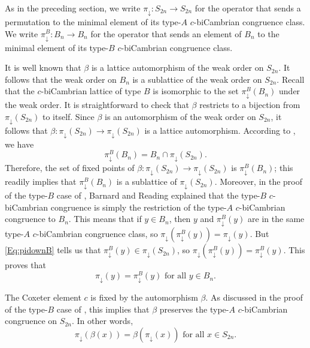 \documentclass[11pt]{amsart}
\theoremstyle{definition}
\begin{document}
As in the preceding section, we write $\pi_\downarrow\colon S_{2n}\to S_{2n}$ for the operator that sends a permutation to the minimal element of its type-$A$ $c$-biCambrian congruence class. We write $\pi_\downarrow^B\colon B_n\to B_n$ for the operator that sends an element of $B_n$ to the minimal element of its type-$B$ $c$-biCambrian congruence class.

It is well known that $\beta$ is a lattice automorphism of the weak order on $S_{2n}$. It follows that the weak order on $B_n$ is a sublattice of the weak order on $S_{2n}$. Recall that the $c$-biCambrian lattice of type $B$ is isomorphic to the set $\pi_\downarrow^B(B_n)$ under the weak order. It is straightforward to check that $\beta$ restricts to a bijection from $\pi_\downarrow(S_{2n})$ to itself. Since $\beta$ is an automorphism of the weak order on $S_{2n}$, it follows that $\beta\colon \pi_{\downarrow}(S_{2n})\to \pi_{\downarrow}(S_{2n})$ is a lattice automorphism. According to \cite[Proposition~3.15]{BarnardReading}, we have \begin{equation}\label{Eq:pidownB}
    \pi_\downarrow^B(B_n)=B_n\cap \pi_\downarrow(S_{2n}).
\end{equation} Therefore, the set of fixed points of $\beta\colon \pi_{\downarrow}(S_{2n})\to \pi_{\downarrow}(S_{2n})$ is $\pi_\downarrow^B(B_n)$; this readily implies that $\pi_\downarrow^B(B_n)$ is a sublattice of $\pi_\downarrow(S_{2n})$. Moreover, in the proof of the type-$B$ case of \cite[Theorem~2.12]{BarnardReading}, Barnard and Reading explained that the type-$B$ $c$-biCambrian congruence is simply the restriction of the type-$A$ $c$-biCambrian congruence to $B_n$. This means that if $y\in B_n$, then $y$ and $\pi_\downarrow^B(y)$ are in the same type-$A$ $c$-biCambrian congruence class, so $\pi_\downarrow(\pi_\downarrow^B(y))=\pi_\downarrow(y)$. But \eqref{Eq:pidownB} tells us that $\pi_\downarrow^B(y)\in\pi_\downarrow(S_{2n})$, so $\pi_\downarrow(\pi_\downarrow^B(y))=\pi_\downarrow^B(y)$. This proves that \begin{equation}\label{Eq:pidownB2}
\pi_\downarrow(y)=\pi_\downarrow^B(y)\text{ for all }y\in B_n.
\end{equation}

The Coxeter element $c$ is fixed by the automorphism $\beta$. As discussed in the proof of the type-$B$ case of \cite[Theorem~2.12]{BarnardReading}, this implies that $\beta$ preserves the type-$A$ $c$-biCambrian congruence on $S_{2n}$. In other words, 
\begin{equation}\label{Eq:pidownB3}
\pi_\downarrow(\beta(x))=\beta(\pi_\downarrow(x))\text{ for all }x\in S_{2n}.
\end{equation}
\end{document}
